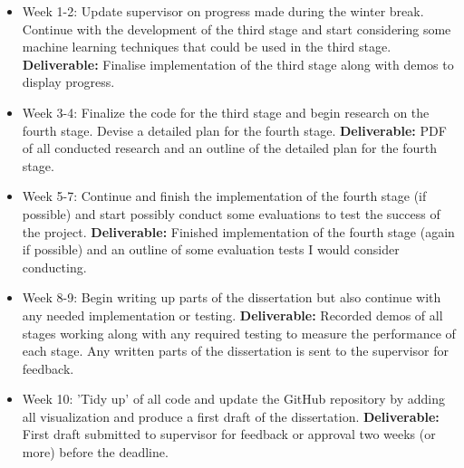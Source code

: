 \documentclass[11pt]{article}
\begin{document}
\begin{itemize}
    \item 
        Week 1-2: Update supervisor on progress made during the winter break. Continue with the 
        development of the third stage and start considering some machine learning techniques 
        that could be used in the third stage. \textbf{Deliverable:} Finalise implementation of 
        the third stage along with demos to display progress.
    \item 
        Week 3-4: Finalize the code for the third stage and begin research on the fourth stage. 
        Devise a detailed plan for the fourth stage. \textbf{Deliverable:} PDF of all conducted research 
        and an outline of the detailed plan for the fourth stage. 
    \item 
        Week 5-7: Continue and finish the implementation of the fourth stage (if possible) and start 
        possibly conduct some evaluations to test the success of the project. \textbf{Deliverable:} 
        Finished implementation of the fourth stage (again if possible) and an outline of some 
        evaluation tests I would consider conducting. 
    \item 
        Week 8-9: Begin writing up parts of the dissertation but also continue with any needed implementation 
        or testing. \textbf{Deliverable:} Recorded demos of all stages working along with any required testing 
        to measure the performance of each stage. Any written parts of the dissertation is sent to the supervisor 
        for feedback.
    \item 
        Week 10: 'Tidy up' of all code and update the GitHub repository by adding all visualization and 
        produce a first draft of the dissertation. \textbf{Deliverable:} First draft submitted 
        to supervisor for feedback or approval two weeks (or more) before the deadline. 
\end{itemize}
\end{document}
